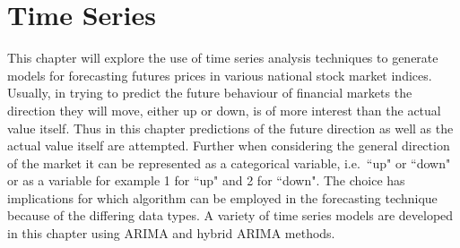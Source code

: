 
\chapter{Time Series} %

\label{Chapter5} %



This chapter will explore the use of time series analysis techniques to generate models for forecasting futures prices in various national stock market indices. Usually, in trying to predict the future behaviour of financial markets the direction they will move, either up or down, is of more interest than the actual value itself. Thus in this chapter predictions of the future direction as well as the actual value itself are attempted. Further when considering the general direction of the market it can be represented as a categorical variable, i.e.\ \textquotedblleft up" or \textquotedblleft down" or as a variable for example 1 for \textquotedblleft up" and 2 for \textquotedblleft down". The choice has implications for which algorithm can be employed in the forecasting technique because of the differing data types. A variety of time series models are developed in this chapter using ARIMA and hybrid ARIMA methods.

